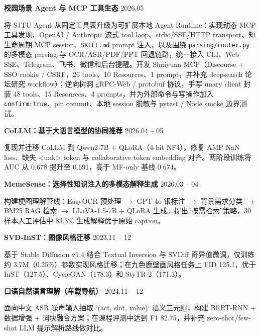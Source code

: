 \documentclass[a4paper,9pt]{extarticle}
\begin{document}
\noindent\textbf{校园场景 Agent 与 MCP 工具生态} \hfill 2026.05
\href{https://github.com/dajiaohuang/shuiyuan-mcp}{\small\faGithub}

{\small 将 SJTU Agent 从固定工具表升级为可扩展本地 Agent Runtime：实现动态 MCP 工具发现、OpenAI / Anthropic 流式 tool loop、stdio/SSE/HTTP transport、短生命周期 MCP session、\texttt{SKILL.md} prompt 注入，以及围绕 \texttt{parsing/router.py} 的多模态 parsing 与 OCR/ASR/PDF/PPT 回退链路，统一接入 CLI、Web SSE、Telegram、飞书、微信和后台提醒。开发 Shuiyuan MCP（Discourse + SSO cookie / CSRF，26 tools、10 Resources、1 prompt，并补充 deepsearch 论坛研究 workflow）；逆向树洞 gRPC-Web / protobuf 协议，手写 unary client 封装 48 tools、15 Resources、4 prompts，并为外部命令与写操作加入 \texttt{confirm:true}、pin commit、本地 session 脱敏与 pytest / Node smoke 边界测试。}

\vspace{3pt}
\noindent\textbf{CoLLM：基于大语言模型的协同推荐} \hfill 2026.04 -- 05
\href{https://github.com/dajiaohuang/CoLLM}{\small\faGithub}

{\small 复现并迁移 CoLLM 到 Qwen2-7B + QLoRA（4-bit NF4），修复 AMP NaN loss、缺失 \textless unk\textgreater{} token 与 collaborative token embedding 对齐。两阶段训练将 AUC 从 0.678 提升至 0.691，高于 MF-only 基线 0.674。}

\vspace{3pt}
\noindent\textbf{MemeSense：选择性知识注入的多模态解释生成} \hfill 2026.03 -- 04

{\small 构建梗图理解管线：EasyOCR 预处理 $\to$ GPT-4o 银标注 $\to$ 背景需求分类 $\to$ BM25 RAG 检索 $\to$ LLaVA-1.5-7B + QLoRA 生成。提出“按需检索”策略，30 样本人工评估中 83.3\% 生成解释优于原始 caption。}

\vspace{3pt}
\noindent\textbf{SVD-InST：图像风格迁移} \hfill 2023.11 -- 12
\href{https://github.com/dajiaohuang/SVD-InST}{\small\faGithub}

{\small 基于 Stable Diffusion v1.4 结合 Textual Inversion 与 SVDiff 奇异值微调，仅训练约 3.7M（0.25\%）参数实现风格迁移；在九色鹿壁画风格任务上 FID 125.1，优于 InST（127.5）、CycleGAN（178.3）和 StyTR-2（171.3）。}

\vspace{3pt}
\noindent\textbf{口语自然语言理解（车载导航）} \hfill 2024.11 -- 12
\href{https://github.com/CalciumArgon/CS3602_Natural_Language_Processing}{\small\faGithub}

{\small 面向中文 ASR 噪声输入抽取 `(act, slot, value)` 语义三元组，构建 BERT-RNN + 数据增强 + 词块融合方案；在课程评测中达到 F1 82.75，并补充 zero-shot/few-shot LLM 提示解析路线做对比。}
\end{document}
